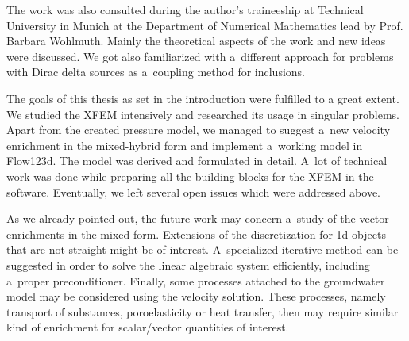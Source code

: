 \documentclass[bibliography=totocnumbered,dvipsnames,FM,Dis, EN]{tulthesis_autoreferat}
\begin{document}
The work was also consulted during the author's traineeship at Technical University in Munich at the Department of Numerical Mathematics
lead by Prof. Barbara Wohlmuth. Mainly the theoretical aspects of the work and new ideas were discussed.
We got also familiarized with a~different approach for problems with Dirac delta sources \cite{koppl_tum_2015, koppl_vidotto_2018}
as a~coupling method for inclusions.


The goals of this thesis as set in the introduction were fulfilled to a great extent.
We studied the XFEM intensively and researched its usage in singular problems.
Apart from the created pressure model, we managed to suggest a~new velocity enrichment in the mixed-hybrid form
and implement a~working model in Flow123d. The model was derived and formulated in detail.
A~lot of technical work was done while preparing all the building blocks for the XFEM in the software.
Eventually, we left several open issues which were addressed above.

As we already pointed out, the future work may concern a~study of the vector enrichments in the mixed form.
Extensions of the discretization for 1d objects that are not straight might be of interest.
A~specialized iterative method can be suggested in order to solve the linear algebraic system efficiently,
including a~proper preconditioner.
Finally, some processes attached to the groundwater model may be considered using the velocity solution.
These processes, namely transport of substances, poroelasticity or heat transfer, then may require
similar kind of enrichment for scalar/vector quantities of interest. 

% 
\end{document}
